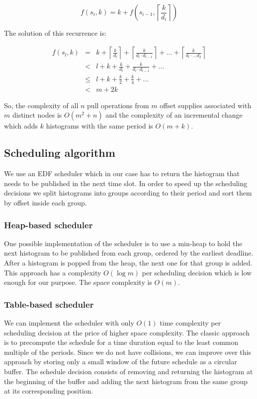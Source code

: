 $$ f(s_i, k) = k + f\left(s_{i-1}, \left\lceil \frac k {d_i} \right\rceil \right)$$

The solution of this recurrence is:

\begin{eqnarray*}
f(s_l,k) &=& k+ \left\lceil \frac k {d_l} \right\rceil + \left\lceil \frac k {d_l\cdot d_{l-1}} \right\rceil + \ldots + \left\lceil \frac k {d_l\cdot \ldots d_2}\right\rceil \\
         &<&l+k+\frac k {d_l}+ \frac k {d_l\cdot d_{l-1}} + \ldots \\
         &\leq & l+k+\frac k 2+\frac k 4 + \ldots \\
         &<& m+2k
\end{eqnarray*}

So, the complexity of all $n$ pull operations from $m$ offset supplies associated with $m$ distinct nodes is $O(m^2+n)$ and the complexity of an incremental change which adds $k$ histograms with the same period is $O(m+k)$. 

\subsection{Scheduling algorithm}

We use an EDF scheduler which in our case has to return the histogram that needs to be published in the next time slot. In order to speed up the scheduling decisions we split histograms into groups according to their period and sort them by offset inside each group. 

\subsubsection*{Heap-based scheduler}

One possible implementation of the scheduler is to use a min-heap to hold the next histogram to be published from each group, ordered by the earliest deadline. After a histogram is popped from the heap, the next one for that group is added. This approach has a complexity $O(\log m)$ per scheduling decision which is low enough for our purpose. The space complexity is $O(m)$.

\subsubsection*{Table-based scheduler}

We can implement the scheduler with only $O(1)$ time complexity per scheduling decision at the price of higher space complexity. The classic approach is to precompute the schedule for a time duration equal to the least common multiple of the periods. Since we do not have collisions, we can improve over this approach by storing only a small window of the future schedule as a circular buffer. The schedule decision consists of removing and returning the histogram at the beginning of the buffer and adding the next histogram from the same group at its corresponding position.
 
